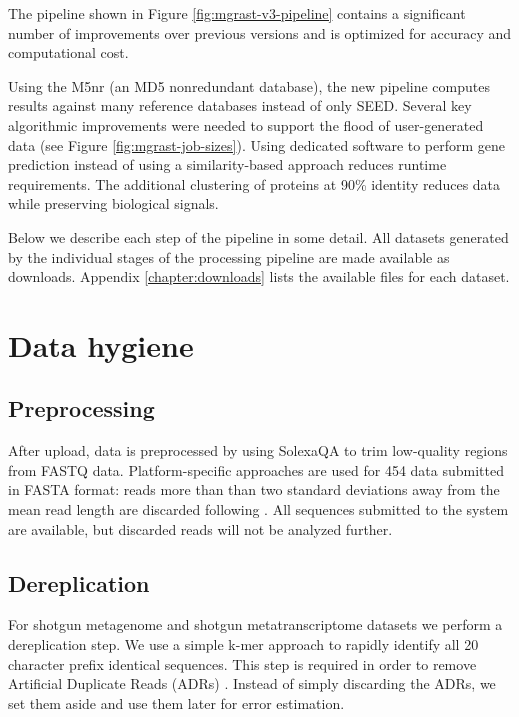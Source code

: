 \documentclass[12pt,fullpage]{report}
\begin{document}
The pipeline shown in Figure \ref{fig:mgrast-v3-pipeline} contains a significant number of improvements over previous versions and is optimized for accuracy and computational cost.

Using the M5nr \cite{M5NR} (an MD5 nonredundant database), the new pipeline computes results against many reference databases instead of only \gls{SEED}.
Several key algorithmic improvements were needed to support the flood of user-generated data (see Figure \ref{fig:mgrast-job-sizes}). Using dedicated software to perform gene prediction instead of using a similarity-based approach reduces runtime requirements. The additional clustering of proteins at 90\% identity reduces data while preserving biological signals.



Below we describe each step of the pipeline in some detail. All datasets generated by the individual stages of the processing pipeline are made available as downloads. Appendix \ref{chapter:downloads} lists the available files for each dataset.




\section{Data hygiene}

\subsection*{Preprocessing}
After upload, data is preprocessed by using SolexaQA \cite{SOLEXAQA} to trim low-quality regions from FASTQ data. Platform-specific approaches are used for 454 data submitted in FASTA format: reads more than than two standard deviations away from the mean read length are discarded following \cite{HUSEPYRO}. All sequences submitted to the system are available, but discarded reads will not be analyzed further.
\subsection*{Dereplication}
For shotgun metagenome and shotgun metatranscriptome datasets we perform a dereplication step.
We use a simple k-mer approach to rapidly identify all 20 character prefix identical sequences.
This step is required in order to remove Artificial Duplicate Reads (\gls{ADR}s) \cite{ADRS}. Instead of simply discarding the ADRs, we set them aside and use them later for error estimation.
\end{document}
